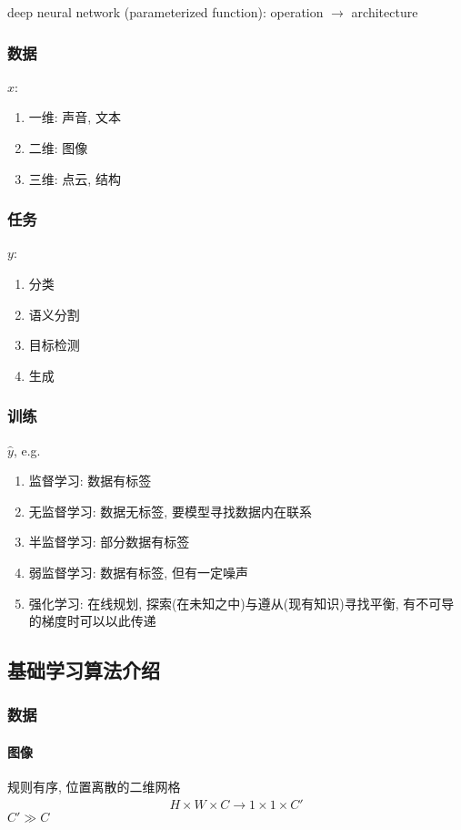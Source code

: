 deep neural network (parameterized function): operation $\rightarrow$ architecture

\subsubsection{数据}
$x$:
\begin{enumerate}
    \item 一维: 声音, 文本
    \item 二维: 图像
    \item 三维: 点云, 结构
\end{enumerate}

\subsubsection{任务}
$y$:
\begin{enumerate}
    \item 分类
    \item 语义分割
    \item 目标检测
    \item 生成
\end{enumerate}

\subsubsection{训练}
$\hat{y}$, e.g.
\begin{enumerate}
    \item 监督学习: 数据有标签
    \item 无监督学习: 数据无标签, 要模型寻找数据内在联系
    \item 半监督学习: 部分数据有标签
    \item 弱监督学习: 数据有标签, 但有一定噪声
    \item 强化学习: 在线规划, 探索(在未知之中)与遵从(现有知识)寻找平衡, 有不可导的梯度时可以以此传递
\end{enumerate}



\subsection{基础学习算法介绍}
\subsubsection{数据}
\paragraph{图像}
规则有序, 位置离散的二维网格
\begin{align*}
    H\times W\times C \rightarrow 1\times 1\times C'
\end{align*}
$C' \gg C$

